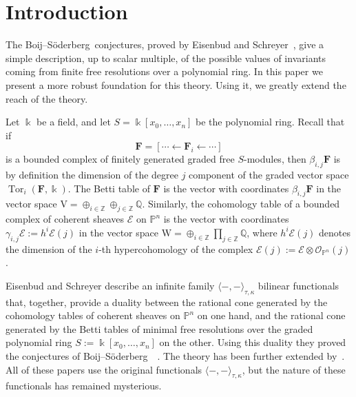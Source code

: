 \documentclass[12pt]{amsart}
\theoremstyle{definition}
\theoremstyle{remark}
\newcommand{\Tor}{\operatorname{Tor}}
\newcommand{\kk}{\Bbbk}
\newcommand{\PP}{\mathbb{P}}
\newcommand{\ZZ}{\mathbb{Z}}
\newcommand{\QQ}{\mathbb{Q}}
\newcommand{\VV}{\mathrm{V}}
\newcommand{\WW}{\mathrm{W}}
\newcommand{\cO}{\mathcal{O}}
\newcommand{\cE}{\mathcal{E}}
\newcommand{\FF}{\mathbf{F}}
\newcommand{\defi}[1]{\textsf{#1}} %
\def\BS{Boij--S\"oderberg~}
\begin{document}
\maketitle

\tableofcontents


\section*{Introduction}
The \BS conjectures, proved by Eisenbud and Schreyer~\cite{eis-schrey1}, give a simple description, up to scalar multiple, of the possible values of invariants coming from finite free resolutions over a polynomial ring. In this paper we present a more robust foundation for this theory. Using it, we greatly extend the 
reach of the theory.

Let $\kk$ be a field, and let $S=\kk[x_0, \dots, x_n]$ be the polynomial ring. Recall that if 
$$
\FF= [\cdots \gets \FF_i \gets \cdots ]
$$
is a bounded complex of finitely generated graded free $S$-modules, then $\beta_{i,j}\FF$ is by definition the dimension of the degree $j$ component of the graded vector space $\Tor_i(\FF,\kk)$.  The \defi{Betti table} of $\FF$ is the vector with coordinates $\beta_{i,j}\FF$ in the vector space $\VV = \oplus_{i\in \ZZ} \oplus_{j\in \ZZ}\QQ$. Similarly, the \defi{cohomology table} of a bounded complex of coherent sheaves $\cE$ on $\PP^{n}$ is the vector with coordinates $\gamma_{i,j}\cE := h^{i}\cE(j)$ in the vector space $\WW = \oplus_{i\in \ZZ}\prod_{j\in \ZZ}\QQ$, where $h^{i}\cE(j)$ denotes the dimension of the $i$-th hypercohomology of the complex $\cE(j) := \cE \otimes \cO_{\PP^{n}}(j)$. 


Eisenbud and Schreyer \cite{eis-schrey1} describe an infinite family $\langle -,-\rangle_{\tau,\kappa}$ bilinear functionals that, together, provide a duality between the rational cone generated by the cohomology tables of coherent sheaves on $\PP^n$ on one hand,  and the rational cone generated by the Betti tables of minimal free resolutions over the graded polynomial ring $S:=\kk[x_0, \dots, x_n]$ on the other. 
Using this duality they proved the conjectures of \BS~\cite{boij-sod1}. The theory has been further extended by~\cites{boij-sod2,eis-schrey2}. All of these papers use the original functionals $\langle -,-\rangle_{\tau,\kappa}$, but the nature of these functionals has remained mysterious. 
\end{document}
